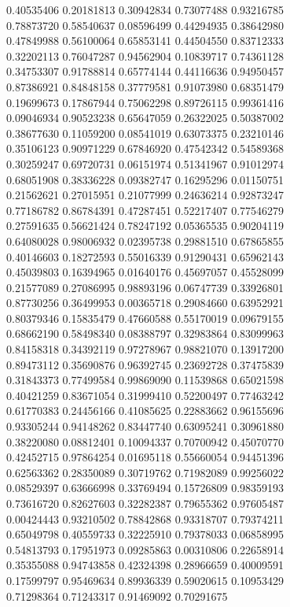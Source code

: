 \begin{figure}
   0.40535406   0.20181813
   0.30942834   0.73077488
   0.93216785   0.78873720
   0.58540637   0.08596499
   0.44294935   0.38642980
   0.47849988   0.56100064
   0.65853141   0.44504550
   0.83712333   0.32202113
   0.76047287   0.94562904
   0.10839717   0.74361128
   0.34753307   0.91788814
   0.65774144   0.44116636
   0.94950457   0.87386921
   0.84848158   0.37779581
   0.91073980   0.68351479
   0.19699673   0.17867944
   0.75062298   0.89726115
   0.99361416   0.09046934
   0.90523238   0.65647059
   0.26322025   0.50387002
   0.38677630   0.11059200
   0.08541019   0.63073375
   0.23210146   0.35106123
   0.90971229   0.67846920
   0.47542342   0.54589368
   0.30259247   0.69720731
   0.06151974   0.51341967
   0.91012974   0.68051908
   0.38336228   0.09382747
   0.16295296   0.01150751
   0.21562621   0.27015951
   0.21077999   0.24636214
   0.92873247   0.77186782
   0.86784391   0.47287451
   0.52217407   0.77546279
   0.27591635   0.56621424
   0.78247192   0.05365535
   0.90204119   0.64080028
   0.98006932   0.02395738
   0.29881510   0.67865855
   0.40146603   0.18272593
   0.55016339   0.91290431
   0.65962143   0.45039803
   0.16394965   0.01640176
   0.45697057   0.45528099
   0.21577089   0.27086995
   0.98893196   0.06747739
   0.33926801   0.87730256
   0.36499953   0.00365718
   0.29084660   0.63952921
   0.80379346   0.15835479
   0.47660588   0.55170019
   0.09679155   0.68662190
   0.58498340   0.08388797
   0.32983864   0.83099963
   0.84158318   0.34392119
   0.97278967   0.98821070
   0.13917200   0.89473112
   0.35690876   0.96392745
   0.23692728   0.37475839
   0.31843373   0.77499584
   0.99869090   0.11539868
   0.65021598   0.40421259
   0.83671054   0.31999410
   0.52200497   0.77463242
   0.61770383   0.24456166
   0.41085625   0.22883662
   0.96155696   0.93305244
   0.94148262   0.83447740
   0.63095241   0.30961880
   0.38220080   0.08812401
   0.10094337   0.70700942
   0.45070770   0.42452715
   0.97864254   0.01695118
   0.55660054   0.94451396
   0.62563362   0.28350089
   0.30719762   0.71982089
   0.99256022   0.08529397
   0.63666998   0.33769494
   0.15726809   0.98359193
   0.73616720   0.82627603
   0.32282387   0.79655362
   0.97605487   0.00424443
   0.93210502   0.78842868
   0.93318707   0.79374211
   0.65049798   0.40559733
   0.32225910   0.79378033
   0.06858995   0.54813793
   0.17951973   0.09285863
   0.00310806   0.22658914
   0.35355088   0.94743858
   0.42324398   0.28966659
   0.40009591   0.17599797
   0.95469634   0.89936339
   0.59020615   0.10953429
   0.71298364   0.71243317
   0.91469092   0.70291675

\end{figure}
